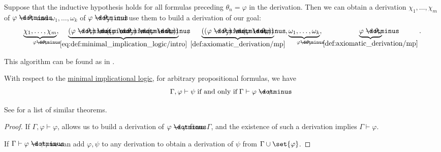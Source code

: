 \begin{algorithm}
\begin{thmenum}
    Suppose that the inductive hypothesis holds for all formulas preceding \( \theta_n = \varphi \) in the derivation. Then we can obtain a derivation \( \chi_1, \ldots, \chi_m \) of \( \varphi \synimplies \theta_i \) and \( \omega_1, \ldots, \omega_k \) of \( \varphi \synimplies \theta_j \), and use them to build a derivation of our goal:
    \small
    \begin{equation*}
      \underbrace{\chi_1, \ldots, \chi_m}_{\varphi \synimplies \theta_i},
      \underbrace{(\varphi \synimplies \theta_i) \synimplies ((\varphi \synimplies \theta_j) \synimplies (\varphi \synimplies \theta_n))}_{\eqref{eq:def:minimal_implication_logic/intro}},
      \underbrace{((\varphi \synimplies \theta_j) \synimplies (\varphi \synimplies \theta_n))}_{\ref{def:axiomatic_derivation/mp}},
      \underbrace{\omega_1, \ldots, \omega_k}_{\varphi \synimplies \theta_j},
      \underbrace{\varphi \synimplies \theta_n}_{\ref{def:axiomatic_derivation/mp}}.
    \end{equation*}
    \normalsize
  \end{thmenum}
\end{algorithm}
\begin{comments}
  \item This algorithm can be found as  in \cite{code}.
\end{comments}

\begin{theorem}\label{thm:implicational_syntactic_deduction_theorem}
  With respect to the \hyperref[def:minimal_implication_logic]{minimal implicational logic}, for arbitrary propositional formulas, we have
  \begin{equation*}
    \Gamma, \varphi \vdash \psi \T{if and only if} \Gamma \vdash \varphi \synimplies \psi.
  \end{equation*}
\end{theorem}
\begin{comments}
  \item See  for a list of similar theorems.
\end{comments}
\begin{proof}
  \SufficiencySubProof If \( \Gamma, \varphi \vdash \varphi \),  allows us to build a derivation of \( \varphi \synimplies \varphi \) from \( \Gamma \), and the existence of such a derivation implies \( \Gamma \vdash \varphi \).

  \NecessitySubProof If \( \Gamma \vdash \varphi \synimplies \psi \), we can add \( \varphi, \psi \) to any derivation to obtain a derivation of \( \psi \) from \( \Gamma \cup \set{ \varphi } \).
\end{proof}

